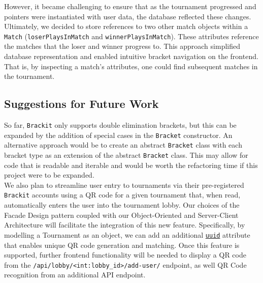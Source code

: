 \documentclass{article}
\begin{document}
However, 
it became challenging to ensure that as the tournament 
progressed and pointers were instantiated with user data, the database reflected these changes. 
Ultimately, we decided to store references to two other match objects within a \texttt{Match} (\texttt{loserPlaysInMatch} and \texttt{winnerPlaysInMatch}). These attributes reference the matches that the loser and winner progress to. This approach simplified database 
representation and enabled intuitive bracket navigation on the frontend. That is, by inspecting a match's attributes, one could find subsequent matches in the tournament.


\subsection{Suggestions for Future Work}
\label{ssec:fw}

So far, \texttt{Brackit} only supports double elimination brackets, but this can be expanded by the addition of special cases in the \texttt{Bracket} constructor. An alternative approach would be to create an abstract \texttt{Bracket}
class with each bracket type as an extension of the abstract \texttt{Bracket} class. This may allow for 
code that is readable and iterable and would be worth the refactoring time if this project were 
to be expanded. \\
We also plan to streamline user entry to tournaments via their pre-registered \texttt{Brackit} accounts using a QR code for a given tournament that, when read, automatically enters the user into the tournament lobby. Our choices of  
the Facade Design pattern coupled with our Object-Oriented and Server-Client Architecture will facilitate the integration of this new feature. Specifically, by modelling a Tournament as an object, we can add an additional \href{https://docs.python.org/3/library/uuid.html}{\texttt{uuid}}
attribute that enables unique QR code generation and matching. Once this feature is supported, further frontend functionality will be needed to display a QR code from the 
\texttt{/api/lobby/<int:lobby\_id>/add-user/} endpoint, as well QR Code recognition from an additional API endpoint.
\end{document}
